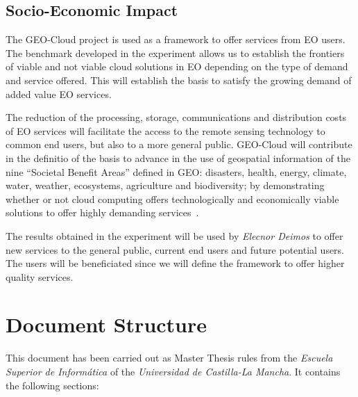 \subsection{Socio-Economic Impact}

The GEO-Cloud project is used as a framework to offer services from \ac{EO}
users. The benchmark developed in the experiment allows us to establish the
frontiers of viable and not viable cloud solutions in \ac{EO} depending on the
type of demand and service offered. This will establish the basis to satisfy the
growing demand of added value \ac{EO} services.

The reduction of the processing, storage, communications and distribution costs
of \ac{EO} services will facilitate the access to the remote sensing technology to
common end users, but also to a more general public. GEO-Cloud will contribute
in the definitio of the basis to advance in the use of geospatial information of the nine
``Societal Benefit Areas'' defined in GEO: disasters, health, energy, climate,
water, weather, ecosystems, agriculture and biodiversity; by demonstrating
whether or not cloud computing offers technologically and economically viable
solutions to offer highly demanding services~\cite{Ge2009}.

The results obtained in the experiment will be used by \emph{Elecnor Deimos} to offer new
services to the general public, current end users and future potential users. The users will be beneficiated since we will define the framework to
offer higher quality services.




\section{Document Structure}

This document has been carried out as Master Thesis rules from the \emph{Escuela
Superior de Informática} of the \emph{Universidad de Castilla-La Mancha}. It contains
the following sections:


